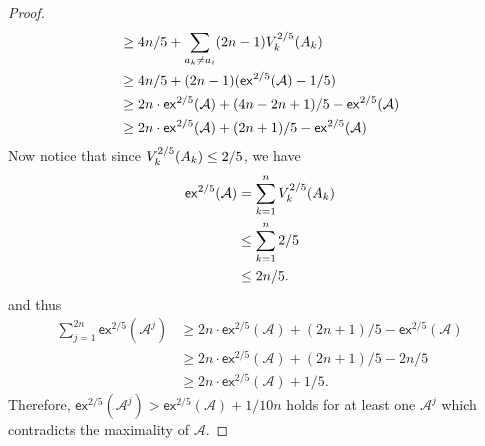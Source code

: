 \begin{proof}
\begin{equation*}
\begin{split}
	&\geq 4n/5 + \sum_{a_k \neq a_i} (2n-1) V^{2/5}_k(A_k)\\
	&\geq 4n/5 + (2n-1)(\mathsf{ex}^{2/5}(\mathcal{A}) - 1/5)\\
	&\geq 2n \cdot \mathsf{ex}^{2/5}(\mathcal{A}) + (4n-2n+1)/5 - \mathsf{ex}^{2/5}(\mathcal{A})\\
	&\geq 2n \cdot \mathsf{ex}^{2/5}(\mathcal{A}) + (2n+1)/5 - \mathsf{ex}^{2/5}(\mathcal{A})
	\end{split} 
\end{equation*}
Now notice that since $V^{2/5}_k(A_k) \leq 2/5$, we have
\begin{equation*}
	\begin{split}
	\mathsf{ex}^{2/5}(\mathcal{A}) & = \sum_{k=1}^n V^{2/5}_k(A_k)\\
	& \leq \sum_{k=1}^n 2/5\\
	& \leq 2n/5. 
	\end{split}
\end{equation*}
and thus 
\begin{equation*}
	\begin{split}
	\sum_{j=1}^{2n} \mathsf{ex}^{2/5}(\mathcal{A}^j) & \geq 2n \cdot \mathsf{ex}^{2/5}(\mathcal{A}) + (2n+1)/5 - \mathsf{ex}^{2/5}(\mathcal{A})\\
	&\geq 2n \cdot \mathsf{ex}^{2/5}(\mathcal{A}) + (2n+1)/5 - 2n/5\\
	&\geq 2n \cdot \mathsf{ex}^{2/5}(\mathcal{A}) + 1/5.
	\end{split}
\end{equation*}
Therefore, $\mathsf{ex}^{2/5}(\mathcal{A}^j) > \mathsf{ex}^{2/5}(\mathcal{A})+1/10n$ holds for at least one $\mathcal{A}^j$ which contradicts the maximality of $\mathcal{A}$.
\end{proof}




